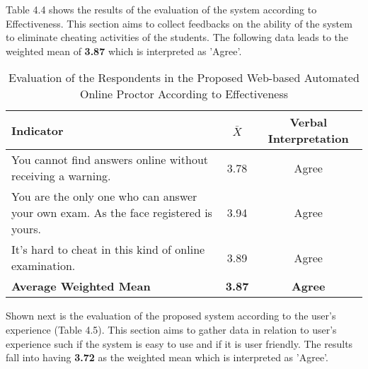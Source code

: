 Table 4.4 shows the results of the evaluation of the system according to Effectiveness.
This section aims to collect feedbacks on the ability of the system to eliminate cheating activities of the students.
The following data leads to the weighted mean of \textbf{3.87} which is interpreted as 'Agree'.

\pagebreak

\begin{table}[h!]
   \begin{center}
      \begin{tabular}{|m{20em}|c|c|}
         \hline
         \textbf{Indicator}                                                                  & \textbf{$\bar{X}$} & \textbf{Verbal Interpretation} \\
         \hline
         You cannot find answers online without receiving a warning.                         & 3.78               & Agree                          \\
         \hline
         You are the only one who can answer your own exam. As the face registered is yours. & 3.94               & Agree                          \\
         \hline
         It's hard to cheat in this kind of online examination.                              & 3.89               & Agree                          \\
         \hline
         \textbf{Average Weighted Mean}                                                      & \textbf{3.87}      & \textbf{Agree}                 \\
         \hline
      \end{tabular}
   \end{center}
   \caption{Evaluation of the Respondents in the Proposed Web-based Automated Online Proctor According to Effectiveness}
\end{table}

Shown next is the evaluation of the proposed system according to the user's experience (Table 4.5).
This section aims to gather data in relation to user's experience such if the system is easy to use and if it is user friendly.
The results fall into having \textbf{3.72} as the weighted mean which is interpreted as 'Agree'.

